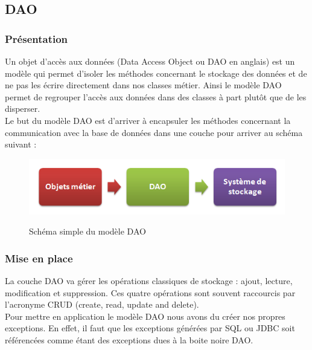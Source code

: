 \subsection{DAO}

\subsubsection{Présentation}
Un objet d'accès aux données (Data Access Object ou DAO en anglais) est un modèle qui permet d'isoler les méthodes concernant le stockage des données et de ne pas les écrire directement dans nos classes métier. Ainsi le modèle DAO permet de regrouper l'accès aux données dans des classes à part plutôt que de les disperser. \\

Le but du modèle DAO est d'arriver à encapsuler les méthodes concernant la communication avec la base de données dans une couche pour arriver au schéma suivant :

\begin{figure}[!h]
  \center
  \includegraphics[scale=0.5]{../graph/dao1.png} \\
  \caption{Schéma simple du modèle DAO}
\end{figure}

\subsubsection{Mise en place}
La couche DAO va gérer les opérations classiques de stockage : ajout, lecture, modification et suppression. Ces quatre opérations sont souvent raccourcis par l'acronyme CRUD (create, read, update and delete). \\

Pour mettre en application le modèle DAO nous avons du créer nos propres exceptions. En effet, il faut que les exceptions générées par SQL ou JDBC soit référencées comme étant des exceptions dues à la boite noire DAO. 

